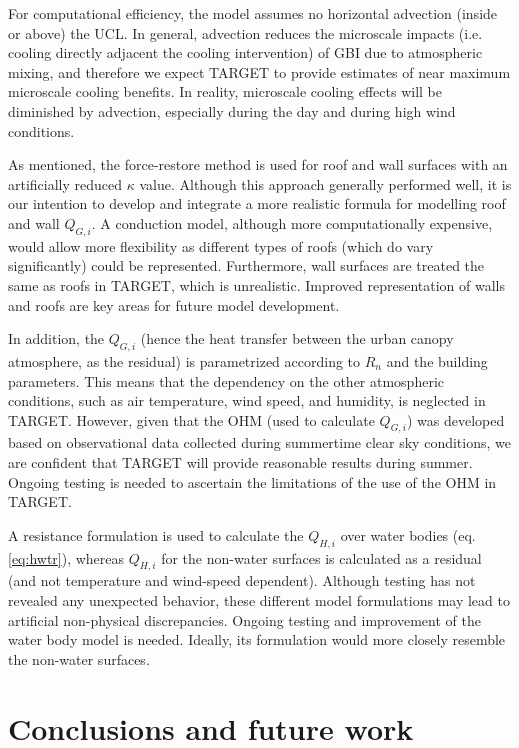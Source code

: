 \documentclass[gmd, manuscript]{copernicus}
\begin{document}
For computational efficiency, the model assumes no horizontal advection (inside or above) the UCL. In general, advection reduces the microscale impacts (i.e. cooling directly adjacent the cooling intervention) of GBI due to atmospheric mixing, and therefore we expect TARGET to provide estimates of near maximum microscale cooling benefits. In reality, microscale cooling effects will be diminished by advection, especially during the day and during high wind conditions.

As mentioned, the force-restore method is used for roof and wall surfaces with an artificially reduced \ensuremath{\kappa} value. Although this approach generally performed well, it is our intention to develop and integrate a more realistic formula for modelling roof and wall \ensuremath{Q_{G,i}}. A conduction model, although more computationally expensive, would allow more flexibility as different types of roofs (which do vary significantly) could be represented. Furthermore, wall surfaces are treated the same as roofs in TARGET, which is unrealistic. Improved representation of walls and roofs are key areas for future model development.  
 

In addition, 
the \ensuremath{Q_{G,i}} (hence the heat transfer between the urban canopy  atmosphere, as the residual) is parametrized according to \ensuremath{R_{n}} and the building parameters. This means that the dependency on the other atmospheric conditions, such as air temperature, wind speed, and humidity, is neglected in TARGET. However, given that the OHM  (used to calculate \ensuremath{Q_{G,i}}) was developed based on observational data collected during summertime clear sky conditions, we are confident that TARGET will provide reasonable results during summer. Ongoing testing is needed to ascertain the limitations of the use of the OHM in TARGET. 

A resistance formulation  is used to calculate the \ensuremath{Q_{H,i}} over water bodies (eq. \ref{eq:hwtr}), whereas \ensuremath{Q_{H,i}} for the non-water surfaces is calculated as a residual (and not temperature and wind-speed dependent). Although testing has not revealed any  unexpected behavior, these different model formulations may  lead to artificial non-physical discrepancies. Ongoing testing and improvement of the water body model is needed. Ideally, its formulation would more closely resemble the non-water surfaces. 

\section{Conclusions and future work}\label{sec:conclusion}
\end{document}
